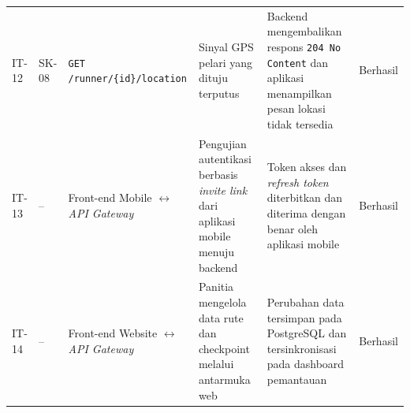\begin{longtable}{p{1.3cm} p{1.6cm} p{3cm} p{4.3cm} p{3cm} p{1.5cm}}
IT-12 & SK-08 & \texttt{GET /runner/\{id\}/location} & Sinyal GPS pelari yang dituju terputus & Backend mengembalikan respons \texttt{204 No Content} dan aplikasi menampilkan pesan lokasi tidak tersedia & Berhasil \\
IT-13 & -- & Front-end Mobile $\leftrightarrow$ \textit{API Gateway} & Pengujian autentikasi berbasis \textit{invite link} dari aplikasi mobile menuju backend & Token akses dan \textit{refresh token} diterbitkan dan diterima dengan benar oleh aplikasi mobile & Berhasil \\
IT-14 & -- & Front-end Website $\leftrightarrow$ \textit{API Gateway} & Panitia mengelola data rute dan checkpoint melalui antarmuka web & Perubahan data tersimpan pada PostgreSQL dan tersinkronisasi pada dashboard pemantauan & Berhasil \\

\end{longtable}
